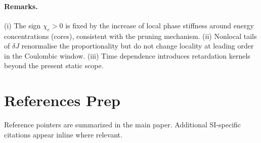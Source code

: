 \documentclass[11pt]{article}
\begin{document}
\paragraph{Remarks.} (i) The sign $\chi_c>0$ is fixed by the increase of local phase stiffness around energy concentrations (cores), consistent with the pruning mechanism. (ii) Nonlocal tails of $\delta J$ renormalise the proportionality but do not change locality at leading order in the Coulombic window. (iii) Time dependence introduces retardation kernels beyond the present static scope.

\section*{References Prep}
\noindent Reference pointers are summarized in the main paper. Additional SI-specific citations appear inline where relevant.

\end{document}
